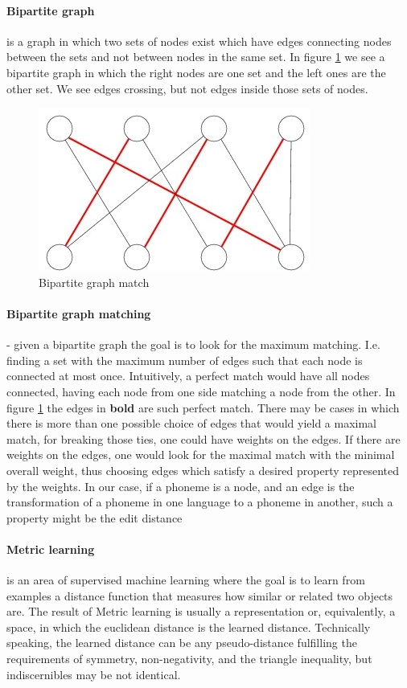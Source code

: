 \documentclass[letterpaper, 11pt]{article}
\begin{document}
\paragraph{Bipartite graph} is a graph in which two sets of nodes exist which have edges connecting nodes between the sets and not between nodes in the same set. In figure \ref{fig:bipartite} we see a bipartite graph in which the right nodes are one set and the left ones are the other set. We see edges crossing, but not edges inside those sets of nodes.

\begin{figure}
	\includegraphics[width=0.8\columnwidth]{Matching_pic_3_1_and_3_2}
	\caption{Bipartite graph match
		\label{fig:bipartite}
	}
\end{figure}
\paragraph{Bipartite graph matching} - given a bipartite graph the goal is to look for the maximum matching. I.e. finding a set with the maximum number of edges such that each node is connected at most once. Intuitively, a perfect match would have all nodes connected, having each node from one side matching a node from the other. In figure \ref{fig:bipartite} the edges in \textbf{bold} are such perfect match.
There may be cases in which there is more than one possible choice of edges that would yield a maximal match, for breaking those ties, one could have weights on the edges. If there are weights on the edges, one would look for the maximal match with the minimal overall weight, thus choosing edges which satisfy a desired property represented by the weights. In our case, if a phoneme is a node, and an edge is the transformation of a phoneme in one language to a phoneme in another, such a property might be the edit distance 
\paragraph{Metric learning} is an area of supervised machine learning where the goal is to learn from examples a distance function that measures how similar or related two objects are. The result of Metric learning is usually a representation or, equivalently, a space, in which the euclidean distance is the learned distance. Technically speaking, the learned distance can be any pseudo-distance fulfilling the requirements of symmetry, non-negativity, and the triangle inequality, but indiscernibles may be not identical.
\end{document}
